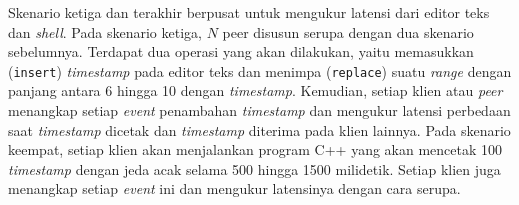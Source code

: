 Skenario ketiga dan terakhir berpusat untuk mengukur latensi dari editor teks dan \textit{shell}. Pada skenario ketiga, $N$ peer disusun serupa dengan dua skenario sebelumnya. Terdapat dua operasi yang akan dilakukan, yaitu memasukkan (\texttt{insert}) \textit{timestamp} pada editor teks dan menimpa (\texttt{replace}) suatu \textit{range} dengan panjang antara 6 hingga 10 dengan \textit{timestamp}. Kemudian, setiap klien atau \textit{peer} menangkap setiap \textit{event} penambahan \textit{timestamp} dan mengukur latensi perbedaan saat \textit{timestamp} dicetak dan \textit{timestamp} diterima pada klien lainnya. Pada skenario keempat, setiap klien akan menjalankan program C++ yang akan mencetak 100 \textit{timestamp} dengan jeda acak selama 500 hingga 1500 milidetik. Setiap klien juga menangkap setiap \textit{event} ini dan mengukur latensinya dengan cara serupa.